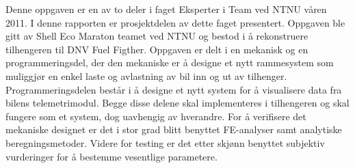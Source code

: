 Denne oppgaven er en av to deler i faget Eksperter i Team ved NTNU våren 2011. I denne rapporten er prosjektdelen av dette faget presentert. Oppgaven ble gitt av Shell Eco Maraton teamet ved NTNU og bestod i å rekonstruere tilhengeren til DNV Fuel Figther. Oppgaven er delt i en mekanisk og en programmeringsdel, der den mekaniske er å designe et nytt rammesystem som muliggjør en enkel laste og avlastning av bil inn og ut av tilhenger. Programmeringsdelen består i å designe et nytt system for å visualisere data fra bilens telemetrimodul. Begge disse delene skal implementeres i tilhengeren og skal fungere som et system, dog uavhengig av hverandre. 
For å verifisere det mekaniske designet er det i stor grad blitt benyttet FE-analyser samt analytiske beregningsmetoder. Videre for testing er det etter skjønn benyttet subjektiv vurderinger for å bestemme vesentlige parametere. 

